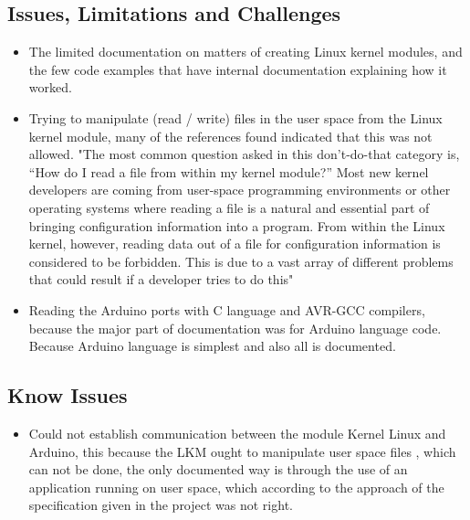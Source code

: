 \documentclass[12pt]{article}
\begin{document}
\subsection{Issues, Limitations and Challenges}
\begin{itemize}
\item The limited documentation on matters of creating Linux kernel modules, and the few code examples that have internal documentation explaining how it worked.
\item Trying to manipulate (read / write) files in the user space from the Linux kernel module, many of the references found indicated that this was not allowed. "The most common question asked in this don't-do-that category is, “How do I read a file from within my kernel module?” Most new kernel developers are coming from user-space programming environments or other operating systems where reading a file is a natural and essential part of bringing configuration information into a program. From within the Linux kernel, however, reading data out of a file for configuration information is considered to be forbidden. This is due to a vast array of different problems that could result if a developer tries to do this" \cite{LinuxJournal}

\item Reading the Arduino ports with C language and AVR-GCC compilers, because the major part of documentation was for Arduino language code. Because Arduino language is simplest and also all is documented. 
\end{itemize}
\subsection{Know Issues}
\begin{itemize}
\item Could not establish communication between the module Kernel Linux and Arduino, this because the LKM ought to manipulate user space files , which can not be done, the only documented way is through the use of an application running on user space, which according to the approach of the specification given in the project was not right.
\end{itemize}
\end{document}
